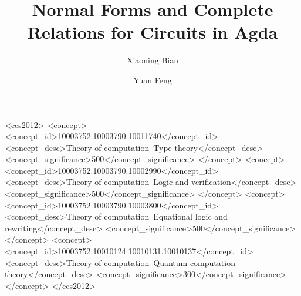 \documentclass[acmsmall,review]{acmart}
\begin{document}
\title{Normal Forms and Complete Relations for Circuits in Agda}

\author{Xiaoning Bian}

\author{Yuan Feng}

\begin{abstract}

\end{abstract}

\begin{CCSXML}
<ccs2012>
<concept>
<concept_id>10003752.10003790.10011740</concept_id>
<concept_desc>Theory of computation~Type theory</concept_desc>
<concept_significance>500</concept_significance>
</concept>
<concept>
<concept_id>10003752.10003790.10002990</concept_id>
<concept_desc>Theory of computation~Logic and verification</concept_desc>
<concept_significance>500</concept_significance>
</concept>
<concept>
<concept_id>10003752.10003790.10003800</concept_id>
<concept_desc>Theory of computation~Equational logic and rewriting</concept_desc>
<concept_significance>500</concept_significance>
</concept>
<concept>
<concept_id>10003752.10010124.10010131.10010137</concept_id>
<concept_desc>Theory of computation~Quantum computation theory</concept_desc>
<concept_significance>300</concept_significance>
</concept>
</ccs2012>
\end{CCSXML}


\maketitle






\end{document}
